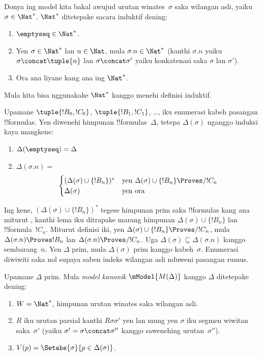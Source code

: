 \documentclass[../../../include/open-logic-section]{subfiles}
\begin{document}


Donya ing model kita bakal awujud urutan winates~$\sigma$ saka
wilangan asli, yaiku $\sigma \in \Nat^*$. $\Nat^*$ ditetepake sacara
induktif dening:
\begin{enumerate}
\item $\emptyseq \in \Nat^*$.
\item Yen $\sigma \in \Nat^*$ lan $n \in \Nat$, mula $\sigma.n \in
  \Nat^*$ (kanthi $\sigma.n$ yaiku $\sigma \concat \tuple{n}$ lan
  $\sigma \concat \sigma'$ yaiku konkatenasi saka $\sigma$ lan $\sigma'$).
\item Ora ana liyane kang ana ing $\Nat^*$.
\end{enumerate}
Mula kita bisa nggunakake $\Nat^*$ kanggo menehi definisi induktif.

Upamane $\tuple{!B_0, !C_0}$, $\tuple{!B_1, !C_1}$, \dots, iku
enumerasi kabeh pasangan !!{formula}s. Yen diwenehi himpunan
!!{formula}s~$\Delta$, tetepa $\Delta(\sigma)$ nganggo induksi
kaya mangkene:
\begin{enumerate}
\item $\Delta(\emptyseq) = \Delta$
\item $\Delta(\sigma.n) = {}$
  \[
  \begin{cases}
    (\Delta(\sigma) \cup \{!B_n\})^* &
    \text{yen $\Delta(\sigma) \cup \{!B_n\} \Proves/ !C_n$} \\
    \Delta(\sigma) & \text{yen ora}
  \end{cases}
  \]
\end{enumerate}
Ing kene, $(\Delta(\sigma) \cup \{!B_n\})^*$ tegese himpunan prim saka
!!{formula}s kang ana miturut , kanthi
lema iku ditrapake marang himpunan $\Delta(\sigma) \cup \{!B_n\}$
lan !!{formula}~$!C_n$. Miturut definisi iki, yen
$\Delta(\sigma) \cup \{!B_n\} \Proves/ !C_n$, mula
$\Delta(\sigma.n) \Proves !B_n$ lan $\Delta(\sigma.n) \Proves/ !C_n$.
Uga $\Delta(\sigma) \subseteq \Delta(\sigma.n)$ kanggo sembarang~$n$.
Yen $\Delta$ prim, mula $\Delta(\sigma)$ prim kanggo kabeh~$\sigma$.
Enumerasi diwiwiti saka nol supaya saben indeks wilangan asli nduweni pasangan rumus.

\begin{defn}
  Upamane $\Delta$ prim. Mula \emph{model kanonik} $\mModel{M(\Delta)}$
  kanggo $\Delta$ ditetepake dening:
  \begin{enumerate}
  \item $W = \Nat^*$, himpunan urutan winates saka wilangan asli.
  \item $R$ iku urutan parsial kanthi $R\sigma\sigma'$ yen lan mung yen
    $\sigma$ iku segmen wiwitan saka~$\sigma'$ (yaiku
    $\sigma' = \sigma \concat \sigma''$ kanggo sawenehing urutan~$\sigma''$).
  \item $V(p) = \Setabs{\sigma}{p \in \Delta(\sigma)}$.
  \end{enumerate}
\end{defn}
\end{document}
